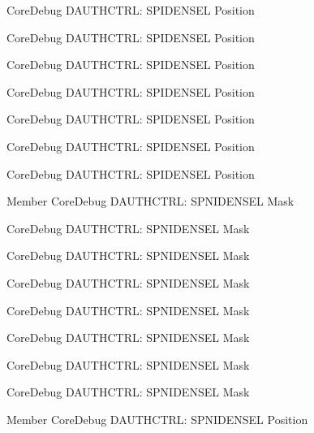 \begin{DoxyRefList}
\label{deprecated__deprecated000363}%
%
Core\+Debug DAUTHCTRL\+: SPIDENSEL Position 

\label{deprecated__deprecated000145}%
%
Core\+Debug DAUTHCTRL\+: SPIDENSEL Position 

\label{deprecated__deprecated000284}%
%
Core\+Debug DAUTHCTRL\+: SPIDENSEL Position 

\label{deprecated__deprecated000644}%
%
Core\+Debug DAUTHCTRL\+: SPIDENSEL Position 

\label{deprecated__deprecated000221}%
%
Core\+Debug DAUTHCTRL\+: SPIDENSEL Position 

\label{deprecated__deprecated000439}%
%
Core\+Debug DAUTHCTRL\+: SPIDENSEL Position 

\label{deprecated__deprecated000542}%
%
Core\+Debug DAUTHCTRL\+: SPIDENSEL Position  
\item[Member \doxylink{group__CMSIS__SCB_gaabb5d6c750c9ec50254134ece2111dcd}{Core\+Debug\+\_\+\+DAUTHCTRL\+\_\+\+SPNIDENSEL\+\_\+\+Msk} ]\label{deprecated__deprecated000142}%
%
Core\+Debug DAUTHCTRL\+: SPNIDENSEL Mask 

\label{deprecated__deprecated000218}%
%
Core\+Debug DAUTHCTRL\+: SPNIDENSEL Mask 

\label{deprecated__deprecated000641}%
%
Core\+Debug DAUTHCTRL\+: SPNIDENSEL Mask 

\label{deprecated__deprecated000539}%
%
Core\+Debug DAUTHCTRL\+: SPNIDENSEL Mask 

\label{deprecated__deprecated000281}%
%
Core\+Debug DAUTHCTRL\+: SPNIDENSEL Mask 

\label{deprecated__deprecated000436}%
%
Core\+Debug DAUTHCTRL\+: SPNIDENSEL Mask 

\label{deprecated__deprecated000360}%
%
Core\+Debug DAUTHCTRL\+: SPNIDENSEL Mask 

\label{deprecated__deprecated000088}%
%
Core\+Debug DAUTHCTRL\+: SPNIDENSEL Mask  
\item[Member \doxylink{group__CMSIS__SCB_ga866734a8e4bec2d6cf091e265c6c0f3d}{Core\+Debug\+\_\+\+DAUTHCTRL\+\_\+\+SPNIDENSEL\+\_\+\+Pos} ]\label{deprecated__deprecated000640}%
%
Core\+Debug DAUTHCTRL\+: SPNIDENSEL Position 


\end{DoxyRefList}
